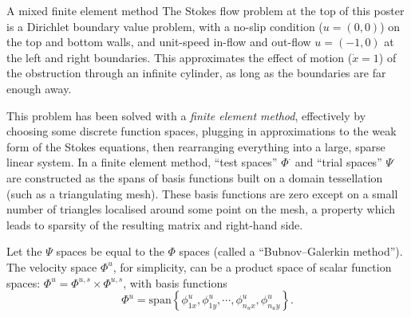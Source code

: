 \documentclass{article}
\begin{document}
\newpage
\vskip 0.2in
{\large A mixed finite element method}
\vskip 0.2in
The Stokes flow problem at the top of this poster is a Dirichlet boundary value problem, with a no-slip condition ($u = (0,0)$) on the top
and bottom walls, and unit-speed in-flow and out-flow $u = (-1,0)$ at the left and right boundaries. This approximates the effect of motion
($\dot{x} = 1$)
of the obstruction through an infinite cylinder, as long as the boundaries are far enough away.

This problem has been solved with a \textit{finite element method}, effectively by choosing some discrete function spaces, plugging in approximations to the weak
form of the Stokes equations, then rearranging everything into a large, sparse linear system.
In a finite element method,
``test spaces'' $\Phi^\cdot$ and ``trial spaces'' $\Psi^\cdot$ are constructed as the spans of basis functions built on a domain tessellation
(such as a triangulating mesh).
These basis functions are zero except on a small number of triangles localised around some point on the mesh, a property which leads to
sparsity of the resulting matrix and right-hand side.

Let the $\Psi$ spaces be equal to the $\Phi$ spaces (called a ``Bubnov--Galerkin method'').
The velocity space $\Phi^u$, for simplicity, can be a product space of scalar function spaces: $\Phi^u = \Phi^{u,s} \times \Phi^{u,s}$,
with basis functions
    $$\Phi^u = \text{span}\left\{\phi^u_{1x},\phi^u_{1y},\cdots,\phi^u_{n_ux},\phi^u_{n_uy}\right\}.$$
\end{document}
